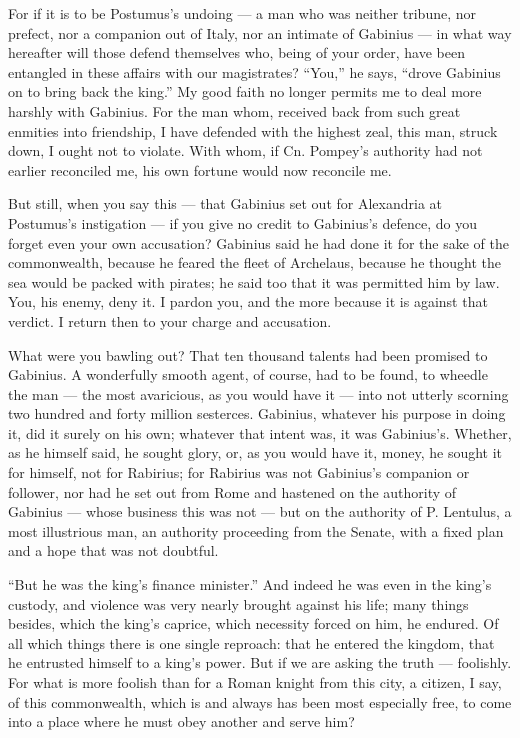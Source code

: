  For if it is to be Postumus's undoing --- a man who was neither tribune, nor prefect, nor a companion out of Italy, nor an intimate of Gabinius --- in what way hereafter will those defend themselves who, being of your order, have been entangled in these affairs with our magistrates? ``You,'' he says, ``drove Gabinius on to bring back the king.'' My good faith no longer permits me to deal more harshly with Gabinius. For the man whom, received back from such great enmities into friendship, I have defended with the highest zeal, this man, struck down, I ought not to violate. With whom, if Cn. Pompey's authority had not earlier reconciled me, his own fortune would now reconcile me.

 But still, when you say this --- that Gabinius set out for Alexandria at Postumus's instigation --- if you give no credit to Gabinius's defence, do you forget even your own accusation? Gabinius said he had done it for the sake of the commonwealth, because he feared the fleet of Archelaus, because he thought the sea would be packed with pirates; he said too that it was permitted him by law. You, his enemy, deny it. I pardon you, and the more because it is against that verdict. I return then to your charge and accusation.

 What were you bawling out? That ten thousand talents had been promised to Gabinius. A wonderfully smooth agent, of course, had to be found, to wheedle the man --- the most avaricious, as you would have it --- into not utterly scorning two hundred and forty million sesterces. Gabinius, whatever his purpose in doing it, did it surely on his own; whatever that intent was, it was Gabinius's. Whether, as he himself said, he sought glory, or, as you would have it, money, he sought it for himself, not for Rabirius; for Rabirius was not Gabinius's companion or follower, nor had he set out from Rome and hastened on the authority of Gabinius --- whose business this was not --- but on the authority of P. Lentulus, a most illustrious man, an authority proceeding from the Senate, with a fixed plan and a hope that was not doubtful.

 ``But he was the king's finance minister.'' And indeed he was even in the king's custody, and violence was very nearly brought against his life; many things besides, which the king's caprice, which necessity forced on him, he endured. Of all which things there is one single reproach: that he entered the kingdom, that he entrusted himself to a king's power. But if we are asking the truth --- foolishly. For what is more foolish than for a Roman knight from this city, a citizen, I say, of this commonwealth, which is and always has been most especially free, to come into a place where he must obey another and serve him?


